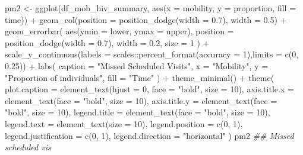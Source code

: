 \documentclass[
  letterpaper,
  DIV=11,
  numbers=noendperiod]{scrartcl}
\newenvironment{Shaded}{\begin{snugshade}}{\end{snugshade}}
\newcommand{\AttributeTok}[1]{\textcolor[rgb]{0.40,0.45,0.13}{#1}}
\newcommand{\DecValTok}[1]{\textcolor[rgb]{0.68,0.00,0.00}{#1}}
\newcommand{\DocumentationTok}[1]{\textcolor[rgb]{0.37,0.37,0.37}{\textit{#1}}}
\newcommand{\FloatTok}[1]{\textcolor[rgb]{0.68,0.00,0.00}{#1}}
\newcommand{\FunctionTok}[1]{\textcolor[rgb]{0.28,0.35,0.67}{#1}}
\newcommand{\NormalTok}[1]{\textcolor[rgb]{0.00,0.23,0.31}{#1}}
\newcommand{\OtherTok}[1]{\textcolor[rgb]{0.00,0.23,0.31}{#1}}
\newcommand{\SpecialCharTok}[1]{\textcolor[rgb]{0.37,0.37,0.37}{#1}}
\newcommand{\StringTok}[1]{\textcolor[rgb]{0.13,0.47,0.30}{#1}}
\begin{document}
\begin{Shaded}
\begin{Highlighting}[]
\NormalTok{pm2 }\OtherTok{\textless{}{-}} \FunctionTok{ggplot}\NormalTok{(df\_mob\_hiv\_summary, }\FunctionTok{aes}\NormalTok{(}\AttributeTok{x =}\NormalTok{ mobility, }\AttributeTok{y =}\NormalTok{ proportion, }\AttributeTok{fill =}\NormalTok{ time)) }\SpecialCharTok{+}
  \FunctionTok{geom\_col}\NormalTok{(}\AttributeTok{position =} \FunctionTok{position\_dodge}\NormalTok{(}\AttributeTok{width =} \FloatTok{0.7}\NormalTok{), }\AttributeTok{width =} \FloatTok{0.5}\NormalTok{) }\SpecialCharTok{+}
  \FunctionTok{geom\_errorbar}\NormalTok{(}
    \FunctionTok{aes}\NormalTok{(}\AttributeTok{ymin =}\NormalTok{ lower, }\AttributeTok{ymax =}\NormalTok{ upper),}
    \AttributeTok{position =} \FunctionTok{position\_dodge}\NormalTok{(}\AttributeTok{width =} \FloatTok{0.7}\NormalTok{),}
    \AttributeTok{width =} \FloatTok{0.2}\NormalTok{,}
    \AttributeTok{size =} \DecValTok{1}
\NormalTok{  ) }\SpecialCharTok{+}
  \FunctionTok{scale\_y\_continuous}\NormalTok{(}\AttributeTok{labels =}\NormalTok{ scales}\SpecialCharTok{::}\FunctionTok{percent\_format}\NormalTok{(}\AttributeTok{accuracy =} \DecValTok{1}\NormalTok{),}\AttributeTok{limits =} \FunctionTok{c}\NormalTok{(}\DecValTok{0}\NormalTok{, }\FloatTok{0.25}\NormalTok{)) }\SpecialCharTok{+}
  \FunctionTok{labs}\NormalTok{(}
    \AttributeTok{caption =} \StringTok{"Missed Scheduled Visits"}\NormalTok{,}
    \AttributeTok{x =} \StringTok{"Mobility"}\NormalTok{,}
    \AttributeTok{y =} \StringTok{"Proportion of individuals"}\NormalTok{,}
    \AttributeTok{fill =} \StringTok{"Time"}
\NormalTok{  ) }\SpecialCharTok{+}
  \FunctionTok{theme\_minimal}\NormalTok{() }\SpecialCharTok{+}
  \FunctionTok{theme}\NormalTok{(}
    \AttributeTok{plot.caption =} \FunctionTok{element\_text}\NormalTok{(}\AttributeTok{hjust =} \DecValTok{0}\NormalTok{, }\AttributeTok{face =} \StringTok{"bold"}\NormalTok{, }\AttributeTok{size =} \DecValTok{10}\NormalTok{),}
    \AttributeTok{axis.title.x =} \FunctionTok{element\_text}\NormalTok{(}\AttributeTok{face =} \StringTok{"bold"}\NormalTok{, }\AttributeTok{size =} \DecValTok{10}\NormalTok{),}
    \AttributeTok{axis.title.y =} \FunctionTok{element\_text}\NormalTok{(}\AttributeTok{face =} \StringTok{"bold"}\NormalTok{, }\AttributeTok{size =} \DecValTok{10}\NormalTok{),}
    \AttributeTok{legend.title =} \FunctionTok{element\_text}\NormalTok{(}\AttributeTok{face =} \StringTok{"bold"}\NormalTok{, }\AttributeTok{size =} \DecValTok{10}\NormalTok{),}
    \AttributeTok{legend.text =} \FunctionTok{element\_text}\NormalTok{(}\AttributeTok{size =} \DecValTok{10}\NormalTok{),}
    \AttributeTok{legend.position =} \FunctionTok{c}\NormalTok{(}\DecValTok{0}\NormalTok{, }\DecValTok{1}\NormalTok{),}
    \AttributeTok{legend.justification =} \FunctionTok{c}\NormalTok{(}\DecValTok{0}\NormalTok{, }\DecValTok{1}\NormalTok{),}
    \AttributeTok{legend.direction =} \StringTok{"horizontal"}
\NormalTok{  )}
\NormalTok{pm2 }\DocumentationTok{\#\# Missed scheduled vis}
\end{Highlighting}
\end{Shaded}
\end{document}
